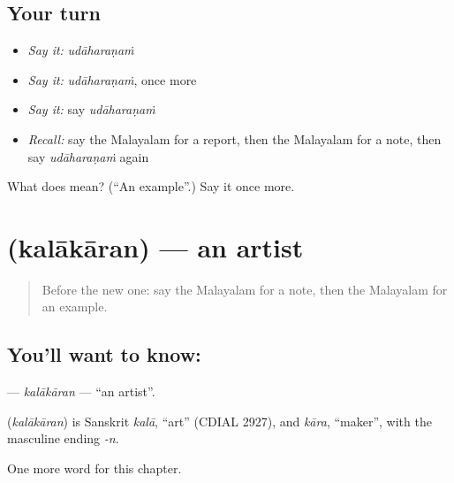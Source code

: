\subsection*{Your turn}
\begin{itemize}
\raggedright
  \item \emph{Say it:} \emph{udāharaṇaṁ}
  \item \emph{Say it:} \emph{udāharaṇaṁ}, once more
  \item \emph{Say it:} say \emph{udāharaṇaṁ}
  \item \emph{Recall:} say the Malayalam for a report, then the Malayalam for a note, then say \emph{udāharaṇaṁ} again
\end{itemize}

\begin{tcolorbox}[breakable,colback=teal!4,colframe=teal!35!black,title={Before you move on}]
What does  mean? (\textquotedblleft{}An example\textquotedblright{}.) Say it once more.
\end{tcolorbox}
\section[\texorpdfstring{\ml{കലാകാരൻ} (kalākāran)}{കലാകാരൻ (kalākāran)}]{ (kalākāran) — an artist}

\label{lesson:ML-C262-kalakaran}



\begin{quote}
Before the new one: say the Malayalam for a note, then the Malayalam for an example.
\end{quote}

\subsection*{You'll want to know: }
\textbf{} — \emph{kalākāran} — \textquotedblleft{}an artist\textquotedblright{}.

\begin{cousinweb}
\textbf{} (\emph{kalākāran}) is Sanskrit \emph{kalā}, \textquotedblleft{}art\textquotedblright{} (CDIAL 2927), and \emph{kāra}, \textquotedblleft{}maker\textquotedblright{}, with the masculine ending \emph{-n}.
\end{cousinweb}

\begin{grammarlens}[title={What you've built}]
One more word for this chapter.
\end{grammarlens}

